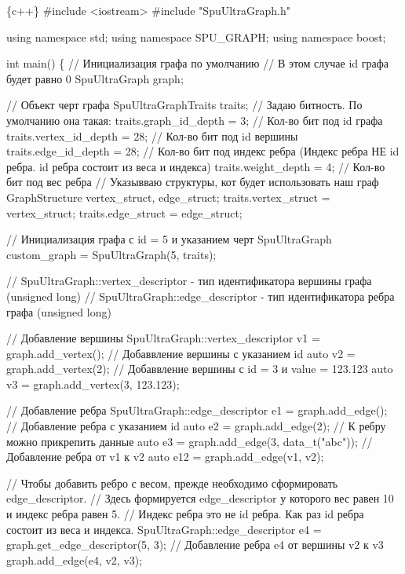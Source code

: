 \begin{DoxyCode}
\{c++\}
#include <iostream>
#include "SpuUltraGraph.h"

using namespace std;
using namespace SPU\_GRAPH;
using namespace boost;

int main()
\{
    // Инициализация графа по умолчанию
    // В этом случае id графа будет равно 0
    SpuUltraGraph graph;

    // Объект черт графа
    SpuUltraGraphTraits traits;
    // Задаю битность. По умолчанию она такая:
    traits.graph\_id\_depth = 3;      // Кол-во бит под id графа
    traits.vertex\_id\_depth = 28;    // Кол-во бит под id вершины
    traits.edge\_id\_depth = 28;      // Кол-во бит под индекс ребра (Индекс ребра НЕ id ребра. id ребра
       состоит из веса и индекса)
    traits.weight\_depth = 4;        // Кол-во бит под вес ребра
    // Указывваю структуры, кот будет использовать наш граф
    GraphStructure vertex\_struct, edge\_struct;
    traits.vertex\_struct = vertex\_struct;
    traits.edge\_struct = edge\_struct;

    // Инициализация графа с id = 5 и указанием черт
    SpuUltraGraph custom\_graph = SpuUltraGraph(5, traits);


    // SpuUltraGraph::vertex\_descriptor - тип идентификатора вершины графа (unsigned long)
    // SpuUltraGraph::edge\_descriptor - тип идентификатора ребра графа (unsigned long)


    // Добавление вершины
    SpuUltraGraph::vertex\_descriptor v1 = graph.add\_vertex();
    // Добаввление вершины с указанием id
    auto v2 = graph.add\_vertex(2);
    // Добаввление вершины с id = 3 и value = 123.123
    auto v3 = graph.add\_vertex(3, 123.123);


    // Добавление ребра
    SpuUltraGraph::edge\_descriptor e1 = graph.add\_edge();
    // Добавление ребра с указанием id
    auto e2 = graph.add\_edge(2);
    // К ребру можно прикрепить данные
    auto e3 = graph.add\_edge(3, data\_t("abc"));
    // Добавление ребра от v1 к v2
    auto e12 = graph.add\_edge(v1, v2);

    // Чтобы добавить ребро с весом, прежде необходимо сформировать edge\_descriptor.
    // Здесь формируется edge\_descriptor у которого вес равен 10 и индекс ребра равен 5.
    // Индекс ребра это не id ребра. Как раз id ребра состоит из веса и индекса.
    SpuUltraGraph::edge\_descriptor e4 = graph.get\_edge\_descriptor(5, 3);
    // Добавление ребра e4 от вершины v2 к v3
    graph.add\_edge(e4, v2, v3);


\end{DoxyCode}

